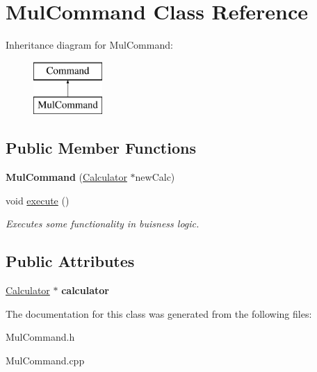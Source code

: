 \hypertarget{class_mul_command}{}\section{Mul\+Command Class Reference}
\label{class_mul_command}
Inheritance diagram for Mul\+Command\+:\begin{figure}[H]
\begin{center}
\leavevmode
\includegraphics[height=2.000000cm]{class_mul_command}
\end{center}
\end{figure}
\subsection*{Public Member Functions}
\begin{DoxyCompactItemize}
\item 
\hypertarget{class_mul_command_ad841942b274629dd6ef16ebff60adc0d}{}{\bfseries Mul\+Command} (\hyperlink{class_calculator}{Calculator} $\ast$new\+Calc)\label{class_mul_command_ad841942b274629dd6ef16ebff60adc0d}

\item 
\hypertarget{class_mul_command_a26122a47a8ddbca2b7a6a3991e04ed66}{}void \hyperlink{class_mul_command_a26122a47a8ddbca2b7a6a3991e04ed66}{execute} ()\label{class_mul_command_a26122a47a8ddbca2b7a6a3991e04ed66}

\begin{DoxyCompactList}\small\item\em Executes some functionality in buisness logic. \end{DoxyCompactList}\end{DoxyCompactItemize}
\subsection*{Public Attributes}
\begin{DoxyCompactItemize}
\item 
\hypertarget{class_mul_command_ad1f527968e768963a14e1b59825022d0}{}\hyperlink{class_calculator}{Calculator} $\ast$ {\bfseries calculator}\label{class_mul_command_ad1f527968e768963a14e1b59825022d0}

\end{DoxyCompactItemize}


The documentation for this class was generated from the following files\+:\begin{DoxyCompactItemize}
\item 
Mul\+Command.\+h\item 
Mul\+Command.\+cpp\end{DoxyCompactItemize}
